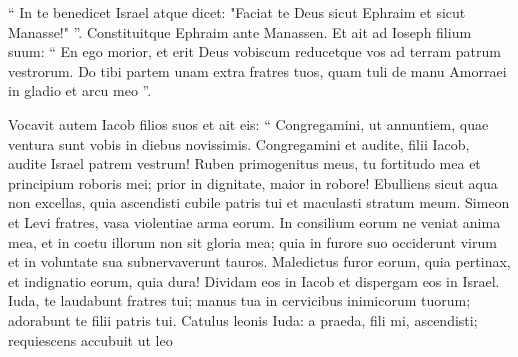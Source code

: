 \begin{biblechapter}
\begin{biblechapter}
\begin{biblechapter}
\begin{biblechapter}
\begin{biblechapter}
\begin{biblechapter}
\begin{biblechapter}
\begin{biblechapter}
\begin{biblechapter}
\begin{biblechapter}
\begin{biblechapter}
\begin{biblechapter}
\begin{biblechapter}
\begin{biblechapter}
\begin{biblechapter}
\begin{biblechapter}
\begin{biblechapter}
\begin{biblechapter}
\begin{biblechapter}
\begin{biblechapter}
\begin{biblechapter}
\begin{biblechapter}
\begin{biblechapter}
\begin{biblechapter}
\begin{biblechapter}
\begin{biblechapter}
\begin{biblechapter}
\begin{biblechapter}
\begin{biblechapter}
\begin{biblechapter}
\begin{biblechapter}
\begin{biblechapter}
\begin{biblechapter}
\begin{biblechapter}
\begin{biblechapter}
\begin{biblechapter}
\begin{biblechapter}
\begin{biblechapter}
\begin{biblechapter}
\begin{biblechapter}
\begin{biblechapter}
\begin{biblechapter}
\begin{biblechapter}
\begin{biblechapter}
\begin{biblechapter}
\begin{biblechapter}
\begin{biblechapter}
\begin{biblechapter}
 “ In te benedicet Israel atque dicet: "Faciat te Deus sicut Ephraim et sicut Manasse!" ”.
 Constituitque Ephraim ante Manassen. 
\verse Et ait ad Ioseph filium suum: “ En ego morior, et erit Deus vobiscum reducetque vos ad terram patrum vestrorum. 
 \verse Do tibi partem unam extra fratres tuos, quam tuli de manu Amorraei in gladio et arcu meo ”.
 
\begin{biblechapter}
\verse Vocavit autem Iacob filios suos et ait eis: “ Congregamini, ut annuntiem, quae ventura sunt vobis in diebus novissimis.
 \verse Congregamini et audite, filii Iacob,
 audite Israel patrem vestrum!
 \verse Ruben primogenitus meus,
 tu fortitudo mea et principium roboris mei;
 prior in dignitate, maior in robore!
 \verse Ebulliens sicut aqua non excellas,
 quia ascendisti cubile patris tui
 et maculasti stratum meum.
 \verse Simeon et Levi fratres,
 vasa violentiae arma eorum.
 \verse In consilium eorum ne veniat anima mea,
 et in coetu illorum non sit gloria mea;
 quia in furore suo occiderunt virum
 et in voluntate sua subnervaverunt tauros.
 \verse Maledictus furor eorum, quia pertinax,
 et indignatio eorum, quia dura!
 Dividam eos in Iacob
 et dispergam eos in Israel.
 \verse Iuda, te laudabunt fratres tui;
 manus tua in cervicibus inimicorum tuorum;
 adorabunt te filii patris tui.
 \verse Catulus leonis Iuda:
 a praeda, fili mi, ascendisti;
 requiescens accubuit ut leo

\end{biblechapter}
\end{biblechapter}
\end{biblechapter}
\end{biblechapter}
\end{biblechapter}
\end{biblechapter}
\end{biblechapter}
\end{biblechapter}
\end{biblechapter}
\end{biblechapter}
\end{biblechapter}
\end{biblechapter}
\end{biblechapter}
\end{biblechapter}
\end{biblechapter}
\end{biblechapter}
\end{biblechapter}
\end{biblechapter}
\end{biblechapter}
\end{biblechapter}
\end{biblechapter}
\end{biblechapter}
\end{biblechapter}
\end{biblechapter}
\end{biblechapter}
\end{biblechapter}
\end{biblechapter}
\end{biblechapter}
\end{biblechapter}
\end{biblechapter}
\end{biblechapter}
\end{biblechapter}
\end{biblechapter}
\end{biblechapter}
\end{biblechapter}
\end{biblechapter}
\end{biblechapter}
\end{biblechapter}
\end{biblechapter}
\end{biblechapter}
\end{biblechapter}
\end{biblechapter}
\end{biblechapter}
\end{biblechapter}
\end{biblechapter}
\end{biblechapter}
\end{biblechapter}
\end{biblechapter}
\end{biblechapter}
